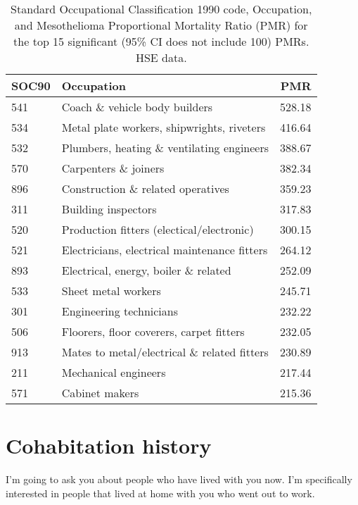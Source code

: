 \documentclass[a4paper,10pt]{article}
\begin{document}
\begin{table}
\begin{tabular}{llr}
\textbf{SOC90} &                                     \textbf{Occupation} &    \textbf{PMR} \\
\midrule
541 &                      Coach \& vehicle body builders &  528.18 \\
534 &          Metal plate workers, shipwrights, riveters &  416.64 \\
532 &         Plumbers, heating \& ventilating engineers  &  388.67 \\
570 &                               Carpenters \& joiners &  382.34 \\ 
896 &                  Construction \& related operatives &  359.23 \\
311 &                                 Building inspectors &  317.83 \\  
520 &           Production fitters (electical/electronic) &  300.15 \\
521 &        Electricians, electrical maintenance fitters &  264.12 \\
893 &  Electrical, energy, boiler \& related              &  252.09 \\
533 &                                 Sheet metal workers &  245.71 \\
301 &    Engineering technicians                          &  232.22 \\
506 &            Floorers, floor coverers, carpet fitters &  232.05 \\
913 &        Mates to metal/electrical \& related fitters &  230.89 \\
211 &                                Mechanical engineers &  217.44 \\
571 &                                      Cabinet makers &  215.36 \\ 
\bottomrule
\end{tabular}
\caption{Standard Occupational Classification 1990 code, Occupation, and Mesothelioma Proportional Mortality Ratio (PMR) for the top 15 significant (95\% CI does not include 100) PMRs. HSE data.}
\label{table:top15pmr}
\end{table}

\newpage

\section{Cohabitation history}
I'm going to ask you about people who have lived with you now. I'm specifically interested in people that lived at home with you who went out to work.
\end{document}
